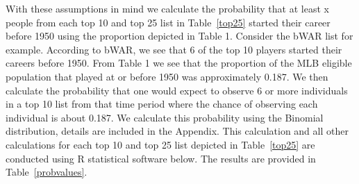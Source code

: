 \documentclass[11pt]{article}\usepackage[]{graphicx}\usepackage[]{color}
\begin{document}
With these assumptions in mind we calculate the probability that at least x 
people from each top 10 and top 25 list in Table~\ref{top25} started their 
career before 1950 using the proportion depicted in Table 1.  Consider the 
bWAR list for example.  According to bWAR, we see that 6 of the top 10 
players started their careers before 1950.  From Table 1 we see that the 
proportion of the MLB eligible population that played at or  
before 1950 was approximately 0.187.  
We then calculate the probability that one would expect to observe 6 or more 
individuals in a top 10 list from that time period where the chance of 
observing each individual is about 0.187.  We calculate 
this probability using the Binomial distribution, details are included in the 
Appendix.  This calculation and all other calculations for each top 10 and 
top 25 list depicted in Table~\ref{top25} are conducted using R statistical 
software below.  The results are provided in Table~\ref{probvalues}. 
\end{document}
